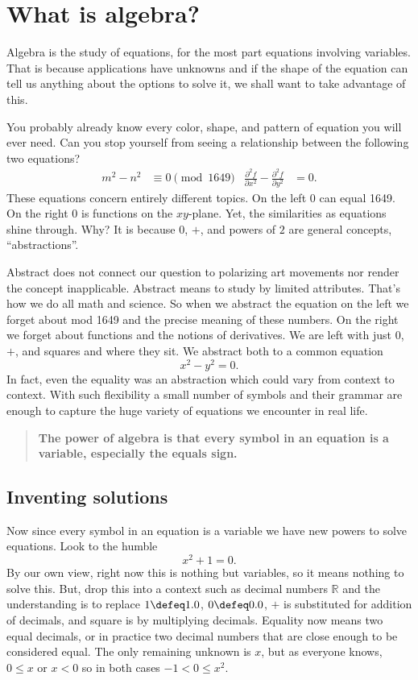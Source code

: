 \chapter{What is algebra?}

Algebra is the study of equations, for the most part equations involving variables.
That is because applications have unknowns and if 
the shape of the equation can tell us anything about the 
options to solve it, we shall want to take advantage of this.



You probably already know every color, shape, and pattern of 
equation you will ever need.  Can you stop yourself from seeing 
a relationship between the following two equations?
\begin{align*}
    m^2-n^2 & \equiv 0 \pmod{1649} 
    & 
    \frac{\partial^2 f}{\partial x^2}-\frac{\partial^2 f}{\partial y^2} & =0.
\end{align*}
These equations concern entirely different topics.  On the left $0$ can 
equal 1649.  On the right $0$ is functions on the $xy$-plane.
Yet, the similarities as equations shine through.  Why? It is because $0$, 
$+$, and  powers of $2$ are general concepts, ``abstractions''.  

Abstract does not connect our question to polarizing art movements nor render the concept inapplicable.  Abstract means to study by limited attributes.  That's how we do all
math and science.  So when we abstract the equation on the left we forget
about mod 1649 and the precise meaning of these numbers.  On the right we forget
about functions and the notions of derivatives.  We are left with just $0$, 
$+$, and squares and where they sit.  We abstract both to a common equation
\[
    x^2-y^2=0.
\]
In fact, even the equality was an abstraction which could vary from context to context.
With such flexibility a small number of symbols and their grammar are enough to capture 
the huge variety of equations we encounter in real life.

\begin{quote}
    \textbf{The power of algebra is that every symbol 
    in an equation is a variable, especially the equals sign.}
\end{quote}

\section{Inventing solutions}
Now since every symbol in an equation is a variable we have new powers 
to solve equations.  Look to the humble 
\[
    x^2+1=0.
\]
By our own view, right now this is nothing but variables, so it means nothing to
solve this.  But, drop this into a context such as decimal numbers $\mathbb{R}$
and the understanding is to replace $1\defeq 1.0$, $0\defeq 0.0$, $+$ is
substituted for addition of decimals, and square is by multiplying decimals.
Equality now means two equal decimals, or in practice two decimal numbers that are close enough 
to be considered equal.  The only remaining unknown is $x$, but as everyone 
knows, $0\leq x$ or $x<0$ so in both cases $-1<0\leq x^2$.

